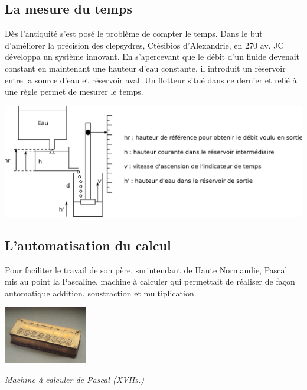 \documentclass[11pt,oneside]{article}
\begin{document}
\subsection{La mesure du temps}

Dès l'antiquité s'est posé le problème de compter le temps. Dans le but
d'améliorer la précision des clepsydres, Ctésibios d'Alexandrie, en 270 av.
JC développa un système innovant. En s'apercevant que le débit d'un fluide
devenait constant en maintenant une hauteur d'eau constante, il introduit un
réservoir entre la source d'eau et réservoir aval. Un flotteur situé dans ce
dernier et relié à une règle permet de mesurer le temps.

 \begin{center}
 \includegraphics[width=.8\textwidth]{png/clepsydre}
 \end{center}

\subsection{L'automatisation du calcul}
\begin{minipage}[c]{0.7\textwidth}
Pour faciliter le travail de son père, surintendant de Haute Normandie, Pascal
mis au point la Pascaline, machine à calculer qui permettait de réaliser de
façon automatique addition, soustraction et multiplication.  

\end{minipage}\hfill
\begin{minipage}[c]{0.2\textwidth}
 \begin{center}
 \includegraphics[height=2.5cm]{png/pascal}

\textit{Machine à calculer de Pascal (XVII\ieme s.)}
 \end{center}
\end{minipage}
\end{document}
